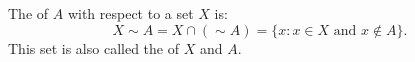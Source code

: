 The  of $A$ with respect to a set $X$ is:
$$
X \sim A = X \cap (\sim A) = \{x : x \in X \text{ and } x \notin A\}.
$$
This set is also called the  of $X$ and $A$.
